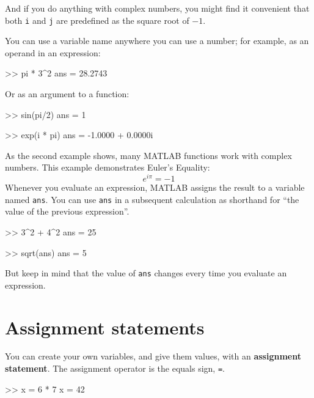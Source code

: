 \documentclass[
]{book}
\numberwithin{Answer}{chapter}
\numberwithin{Exercise}{chapter}
\begin{document}
And if you do anything with complex numbers, you might find it
convenient that both {\tt i} and {\tt j} are predefined as the square
root of $-1$.


You can use a variable name anywhere you can use a number; for example, as
an operand in an expression:

\begin{code}
>> pi * 3^2
ans = 28.2743
\end{code}

Or as an argument to a function:

\begin{code}
>> sin(pi/2)
ans = 1

>> exp(i * pi)
ans = -1.0000 + 0.0000i
\end{code}


As the second example shows, many MATLAB functions work with
complex numbers.  This example demonstrates Euler's Equality:
%
\begin{equation*}
e^{i \pi} = -1
\end{equation*}
%
Whenever you evaluate an expression, MATLAB assigns the result to
a variable named {\tt ans}.  You can use {\tt ans} in a subsequent
calculation as shorthand for ``the value of the previous expression''.

\begin{code}
>> 3^2 + 4^2
ans = 25

>> sqrt(ans)
ans = 5
\end{code}

But keep in mind that the value of {\tt ans} changes every time
you evaluate an expression.


\section{Assignment statements}

You can create your own variables, and give them values, with
an {\bf assignment statement}.  The assignment operator is the
equals sign, {\tt =}.


\begin{code}
>> x = 6 * 7
x = 42
\end{code}
\end{document}
